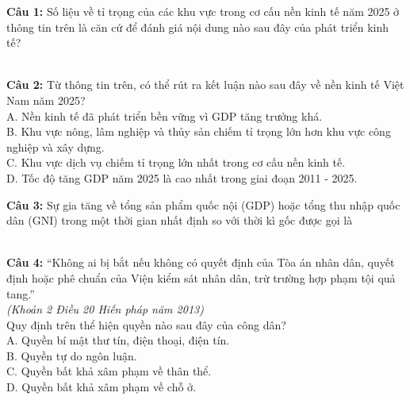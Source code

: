 \documentclass[12pt,a4paper]{article}
\begin{document}
\noindent \textbf{Câu 1:} Số liệu về tỉ trọng của các khu vực trong cơ cấu nền kinh tế năm 2025 ở thông tin trên là căn cứ để đánh giá nội dung nào sau đây của phát triển kinh tế?\\
\noindent{}\\
\noindent{}

\noindent \textbf{Câu 2:} Từ thông tin trên, có thể rút ra kết luận nào sau đây về nền kinh tế Việt Nam năm 2025?\\
\noindent A. Nền kinh tế đã phát triển bền vững vì GDP tăng trưởng khá.\\
\noindent B. Khu vực nông, lâm nghiệp và thủy sản chiếm tỉ trọng lớn hơn khu vực công nghiệp và xây dựng.\\
\noindent C. Khu vực dịch vụ chiếm tỉ trọng lớn nhất trong cơ cấu nền kinh tế.\\
\noindent D. Tốc độ tăng GDP năm 2025 là cao nhất trong giai đoạn 2011 - 2025.

\noindent \textbf{Câu 3:} Sự gia tăng về tổng sản phẩm quốc nội (GDP) hoặc tổng thu nhập quốc dân (GNI) trong một thời gian nhất định so với thời kì gốc được gọi là\\
\noindent{}\\
\noindent{}

\noindent \textbf{Câu 4:} ``Không ai bị bắt nếu không có quyết định của Tòa án nhân dân, quyết định hoặc phê chuẩn của Viện kiểm sát nhân dân, trừ trường hợp phạm tội quả tang.''\\
\hspace*{\fill}\textit{(Khoản 2 Điều 20 Hiến pháp năm 2013)}\\
Quy định trên thể hiện quyền nào sau đây của công dân?\\
\noindent A. Quyền bí mật thư tín, điện thoại, điện tín.\\
\noindent B. Quyền tự do ngôn luận.\\
\noindent C. Quyền bất khả xâm phạm về thân thể.\\
\noindent D. Quyền bất khả xâm phạm về chỗ ở.
\end{document}
